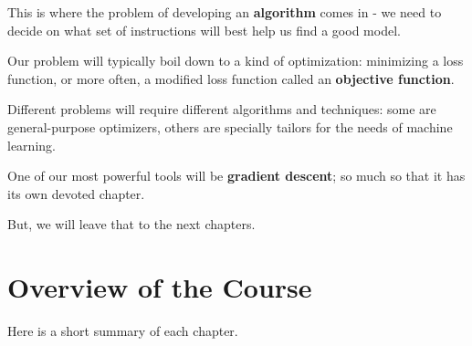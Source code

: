     This is where the problem of developing an \textbf{algorithm} comes in - we need to decide on what set of instructions will best help us find a good model.
    
    Our problem will typically boil down to a kind of optimization: minimizing a loss function, or more often, a modified loss function called an \textbf{objective function}.
    
    Different problems will require different algorithms and techniques: some are general-purpose optimizers, others are specially tailors for the needs of machine learning.
    
    One of our most powerful tools will be \textbf{gradient descent}; so much so that it has its own devoted chapter.
    
    But, we will leave that to the next chapters.


\section{Overview of the Course}

    Here is a short summary of each chapter.
    
